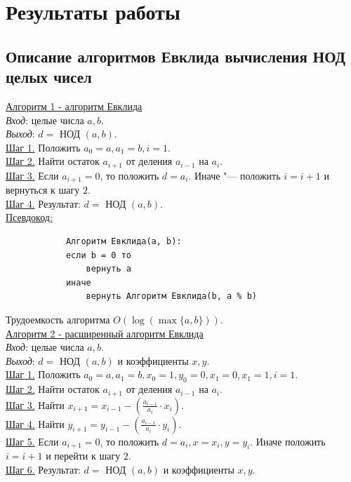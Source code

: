 \documentclass[bachelor, och, labwork]{shiza}
\begin{document}
\section{Результаты работы}
    \subsection{Описание алгоритмов Евклида вычисления НОД целых чисел}

        \underline{Алгоритм 1 - алгоритм Евклида}\\
            \textit{Вход}: целые числа $a, b$.\\
            \textit{Выход}: $d =$ НОД $(a, b)$.\\
            \underline{Шаг 1.} Положить $a_0 = a, a_1 = b, i = 1$.\\
            \underline{Шаг 2.} Найти остаток $a_{i + 1}$ от деления $a_{i - 1}$
            на $a_i$.\\
            \underline{Шаг 3.} Если $a_{i + 1} = 0$, то положить $d = a_i$.
            Иначе "--- положить $i = i + 1$ и вернуться к шагу $2$.\\
            \underline{Шаг 4.} Результат: $d =$ НОД $(a, b)$.\\
            
        \underline{Псевдокод:}
            \begin{verbatim}
            Алгоритм Евклида(a, b):
            если b = 0 то
                вернуть a
            иначе
                вернуть Алгоритм Евклида(b, a % b)        
            \end{verbatim}
            
            Трудоемкость алгоритма $O(\log(\max\{a, b\}))$.\\

        \underline{Алгоритм 2 - расширенный алгоритм Евклида}\\
            \textit{Вход}: целые числа $a, b$.\\
            \textit{Выход}: $d =$ НОД $(a, b)$ и коэффициенты $x, y$.\\
            \underline{Шаг 1.} Положить $a_0 = a, a_1 = b, x_0 = 1, y_0 = 0, x_1
            = 0, x_1 = 1, i = 1$.\\ 
            \underline{Шаг 2.} Найти остаток $a_{i + 1}$ от деления $a_{i - 1}$
            на $a_i$.\\
            \underline{Шаг 3.} Найти $x_{i + 1} = x_{i - 1} - (\frac{a_{i - 1}}{a_i} \cdot x_i)$.\\
            \underline{Шаг 4.} Найти $y_{i + 1} = y_{i - 1} - (\frac{a_{i - 1}}{a_i} \cdot y_i)$.\\
            \underline{Шаг 5.} Если $a_{i + 1} = 0$, то положить $d = a_i, x =
            x_i, y = y_i$. Иначе положить $i = i + 1$ и перейти к шагу $2$.\\
            \underline{Шаг 6.} Результат: $d =$ НОД $(a, b)$ и коэффициенты $x,
            y$.\\
            
\end{document}
